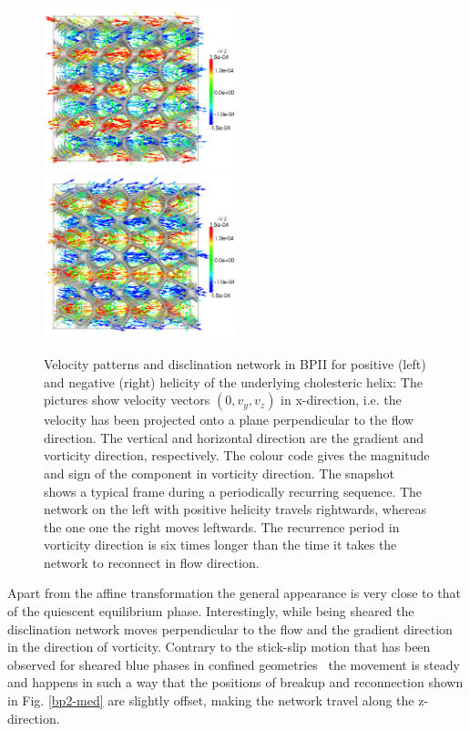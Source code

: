 \documentclass[aps,pre,reprint,superscriptaddress, twocolumn]{revtex4}
\begin{document}
\begin{figure}[htpb]
\includegraphics[width=0.495\textwidth]{v_yz-v_z-160k_run902.png}
\includegraphics[width=0.495\textwidth]{v_yz-v_z-160k_run903.png}
\caption{Velocity patterns and disclination network in BPII for positive (left) and negative (right) helicity of the 
underlying cholesteric helix: The pictures show velocity vectors $(0,v_y,v_z)$ in x-direction, 
i.e. the velocity has been projected onto a plane perpendicular to the flow direction. 
The vertical and horizontal direction are the gradient and vorticity direction, respectively.
The colour code gives the magnitude and sign of the component in vorticity direction.
The snapshot shows a typical frame during a periodically recurring sequence.
The network on the left with positive helicity travels rightwards, whereas the one one the right
moves leftwards. The recurrence period in vorticity direction is six times longer than the time it takes the network 
to reconnect in flow direction.}
\label{bp2-velo}
\end{figure}

Apart from the affine transformation the general appearance is very close to that 
of the quiescent equilibrium phase.
Interestingly, while being sheared the disclination network moves perpendicular to the flow and 
the gradient direction in the direction of vorticity.
Contrary to the stick-slip motion that has been observed for sheared blue phases in confined
geometries~\cite{Henrich:2012b} the movement is steady and happens in such a way that the 
positions of breakup and reconnection shown in Fig. \ref{bp2-med} are slightly offset, 
making the network travel along the z-direction.
\end{document}
